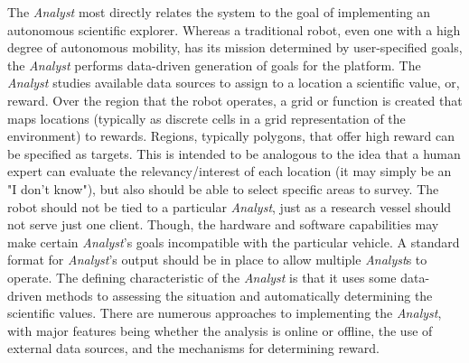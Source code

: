 \documentclass{tamuccthesis}
\begin{document}
The \textit{Analyst} most directly relates the system to the goal of implementing an autonomous scientific explorer. Whereas a traditional robot, even one with a high degree of autonomous mobility, has its mission determined by user-specified goals, the \textit{Analyst} performs data-driven generation of goals for the platform. The \textit{Analyst} studies available data sources to assign to a location a scientific value, or, reward. Over the region that the robot operates, a grid or function is created that maps locations (typically as discrete cells in a grid representation of the environment) to rewards. Regions, typically polygons, that offer high reward can be specified as targets. This is intended to be analogous to the idea that a human expert can evaluate the relevancy/interest of each location (it may simply be an "I don't know"), but also should be able to select specific areas to survey. The robot should not be tied to a particular \textit{Analyst}, just as a research vessel should not serve just one client. Though, the hardware and software capabilities may make certain \textit{Analyst}'s goals incompatible with the particular vehicle. A standard format for \textit{Analyst}'s output should be in place to allow multiple \textit{Analyst}s to operate. The defining characteristic of the \textit{Analyst} is that it uses some data-driven methods to assessing the situation and automatically determining the scientific values. There are numerous approaches to implementing the \textit{Analyst}, with major features being whether the analysis is online or offline, the use of external data sources, and the mechanisms for determining reward. 
\end{document}
